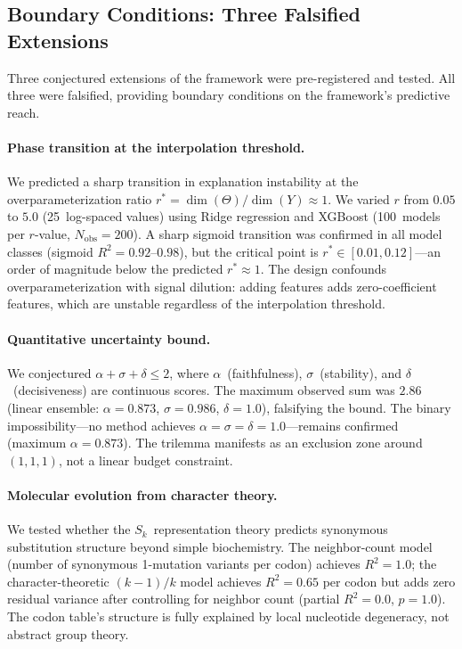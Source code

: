\documentclass[11pt,a4paper]{article}
\begin{document}
\subsection{Boundary Conditions: Three Falsified Extensions}
\label{sec:falsified-extensions}

Three conjectured extensions of the framework were pre-registered and tested.
All three were falsified, providing boundary conditions on the framework's
predictive reach.

\paragraph{Phase transition at the interpolation threshold.}
We predicted a sharp transition in explanation instability at the
overparameterization ratio $r^* = \dim(\Theta)/\dim(Y) \approx 1$.  We varied
$r$ from $0.05$ to $5.0$ (25~log-spaced values) using Ridge regression and
XGBoost (100~models per $r$-value, $N_{\text{obs}} = 200$).  A sharp sigmoid
transition was confirmed in all model classes (sigmoid $R^2 = 0.92\text{--}0.98$),
but the critical point is $r^* \in [0.01, 0.12]$---an order of magnitude below
the predicted $r^* \approx 1$.  The design confounds overparameterization with
signal dilution: adding features adds zero-coefficient features, which are
unstable regardless of the interpolation threshold.

\paragraph{Quantitative uncertainty bound.}
We conjectured $\alpha + \sigma + \delta \leq 2$, where $\alpha$~(faithfulness),
$\sigma$~(stability), and $\delta$~(decisiveness) are continuous scores.
The maximum observed sum was $2.86$ (linear ensemble: $\alpha = 0.873$,
$\sigma = 0.986$, $\delta = 1.0$), falsifying the bound.  The binary
impossibility---no method achieves $\alpha = \sigma = \delta = 1.0$---remains
confirmed (maximum $\alpha = 0.873$).  The trilemma manifests as an exclusion
zone around $(1, 1, 1)$, not a linear budget constraint.

\paragraph{Molecular evolution from character theory.}
We tested whether the $S_k$~representation theory predicts synonymous
substitution structure beyond simple biochemistry.  The neighbor-count model
(number of synonymous 1-mutation variants per codon) achieves $R^2 = 1.0$; the
character-theoretic $(k{-}1)/k$ model achieves $R^2 = 0.65$ per codon but adds
zero residual variance after controlling for neighbor count (partial $R^2 = 0.0$,
$p = 1.0$).  The codon table's structure is fully explained by local
nucleotide degeneracy, not abstract group theory.
\end{document}
